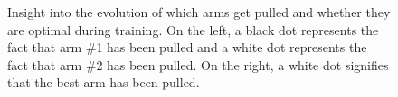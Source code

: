 \begin{figure}
	\centering
	\caption{Insight into the evolution of which arms get pulled and 
	whether they are optimal during training. On the left, a black dot
	represents the fact that arm \#1 has been pulled and a white dot
	represents the fact that arm \#2 has been pulled. On the right, a white
	dot signifies that the best arm has been pulled.}
	\label{fig:bandit_optimality}
\end{figure}

